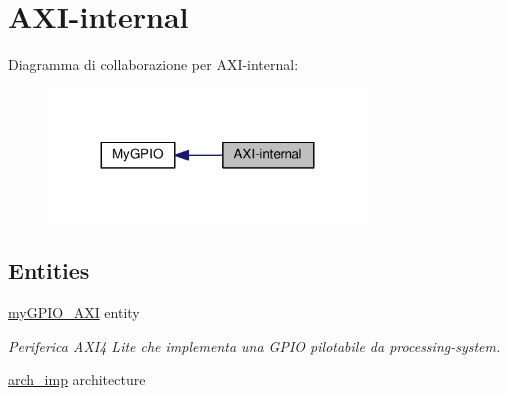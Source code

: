 \hypertarget{group___a_x_i-internal}{\section{A\+X\+I-\/internal}
\label{group___a_x_i-internal}
}
Diagramma di collaborazione per A\+X\+I-\/internal\+:\nopagebreak
\begin{figure}[H]
\begin{center}
\leavevmode
\includegraphics[width=239pt]{group___a_x_i-internal}
\end{center}
\end{figure}
\subsection*{Entities}
\begin{DoxyCompactItemize}
\item 
\hyperlink{classmy_g_p_i_o___a_x_i}{my\+G\+P\+I\+O\+\_\+\+A\+X\+I} entity
\begin{DoxyCompactList}\small\item\em Periferica A\+X\+I4 Lite che implementa una G\+P\+I\+O pilotabile da processing-\/system. \end{DoxyCompactList}\item 
\hyperlink{classmy_g_p_i_o___a_x_i_1_1arch__imp}{arch\+\_\+imp} architecture
\end{DoxyCompactItemize}
